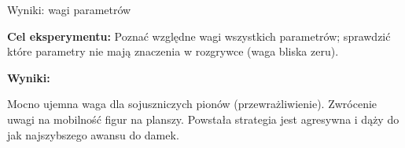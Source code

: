 \begin{frame}{Wyniki: wagi parametrów}

    \textbf{Cel eksperymentu:} Poznać względne wagi wszystkich parametrów; sprawdzić które parametry nie mają znaczenia w rozgrywce (waga bliska zeru).

    \textbf{Wyniki:}
    \begin{itemize}
        \myitem Mocno ujemna waga dla sojuszniczych pionów (przewrażliwienie).
        \myitem Zwrócenie uwagi na mobilność figur na planszy.
        \myitem Powstała strategia jest agresywna i dąży do jak najszybszego awansu do damek.
    \end{itemize}

\end{frame}
